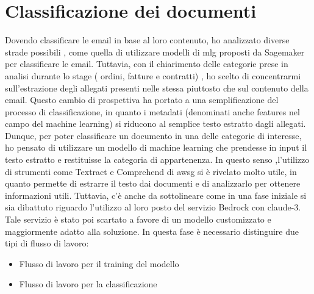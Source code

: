 \section{Classificazione dei documenti}
\label{sec:classificazione-documenti}
Dovendo classificare le email in base al loro contenuto, ho analizzato diverse strade possibili , come quella di utilizzare modelli di \gls{mlg} proposti da Sagemaker per classificare le email. Tuttavia, con il chiarimento delle categorie prese in analisi durante lo stage ( ordini, fatture e contratti) , ho scelto di concentrarmi sull'estrazione degli allegati presenti nelle stessa piuttosto che sul contenuto della email. Questo cambio di prospettiva ha portato a una semplificazione del processo di classificazione, in quanto i metadati (denominati anche features nel campo del machine learning) si riducono al semplice testo estratto dagli allegati. Dunque, per poter classificare un documento in una delle categorie di interesse, ho pensato di utilizzare un modello di machine learning che prendesse in input il testo estratto e restituisse la categoria di appartenenza. In questo senso ,l'utilizzo di strumenti come Textract e Comprehend di \gls{awsg} si è rivelato molto utile, in quanto permette di estrarre il testo dai documenti e di analizzarlo per ottenere informazioni utili. Tuttavia, c'è anche da sottolineare come in una fase iniziale si sia dibattuto riguardo l'utilizzo al loro posto del servizio Bedrock con claude-3. Tale servizio è stato poi scartato a favore di un modello customizzato e maggiormente adatto alla soluzione. 
 In questa fase è necessario distinguire due tipi di flusso di lavoro:
\begin{itemize}
    \item Flusso di lavoro per il training del modello
    \item Flusso di lavoro per la classificazione 
\end{itemize}
